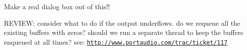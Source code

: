 \begin{DoxyRefList}
Make a real dialog box out of this!!  
\item[\label{todo__todo000041}%
\hypertarget{todo__todo000041}{}%
Member \hyperlink{pa__mac__core__internal_8h_a3520d8a8ca48a25c9b99708f6033811d}{Write\+Stream} (Pa\+Stream $\ast$stream, const void $\ast$buffer, unsigned long frames)]R\+E\+V\+I\+EW\+: consider what to do if the output underflows. do we requeue all the existing buffers with zeros? should we run a separate thread to keep the buffers enqueued at all times? see\+: \href{http://www.portaudio.com/trac/ticket/117}{\tt http\+://www.\+portaudio.\+com/trac/ticket/117} 
\end{DoxyRefList}